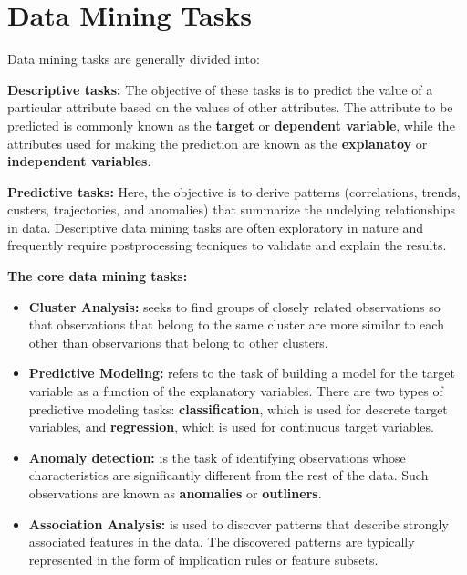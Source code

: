 \section{Data Mining Tasks}
	
	Data mining tasks are generally divided into:

	{\bf Descriptive tasks:} The objective of these tasks is to predict the value of a particular 
	attribute based on the values of other attributes. The attribute to be predicted is commonly 
	known as the {\bf target} or {\bf dependent variable}, while the attributes used for making the
	prediction are known as the {\bf explanatoy} or {\bf independent variables}. 

	{\bf Predictive tasks:} Here, the objective is to derive patterns (correlations, trends, custers, 
	trajectories, and anomalies) that summarize the undelying relationships in data. Descriptive 
	data mining tasks are often exploratory in nature and frequently require postprocessing tecniques
	to validate and explain the results. 

	{\bf The core data mining tasks:}
	\begin{itemize}
		\item {\bf Cluster Analysis:} seeks to find groups of closely related observations
		so that observations that belong to the same cluster are more similar to each other
		than observarions that belong to other clusters.
		\item {\bf Predictive Modeling:} refers to the task of building a model for the 
		target variable as a function of the explanatory variables. There are two types of 
		predictive modeling tasks: {\bf classification}, which is used for descrete target 
		variables, and {\bf regression}, which is used for continuous target variables. 
		\item {\bf Anomaly detection:} is the task of identifying observations whose 
		characteristics are significantly different from the rest of the data. Such observations
		are known as {\bf anomalies} or {\bf outliners}.
		\item {\bf Association Analysis:} is used to discover patterns that describe strongly
		associated features in the data. The discovered patterns are typically represented in the 
		form of implication rules or feature subsets. 

	\end{itemize}



